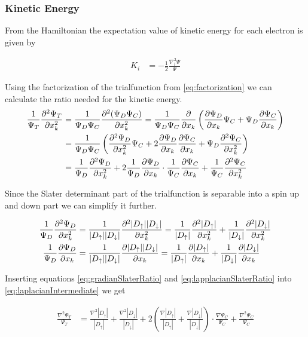 \documentclass[11pt]{article}
\begin{document}
		\subsubsection{Kinetic Energy}
			From the Hamiltonian the expectation value of kinetic energy for each electron is given by

			\begin{align}
				K_i &= - \frac{1}{2} \frac{\nabla^2_i \Psi}{\Psi}
			\end{align}

				Using the factorization of the trialfunction from \eqref{eq:factorization} we can calculate the ratio needed for the kinetic energy.
			\begin{align}
				\frac{1}{\Psi_T}\pdv[2]{\Psi_T}{x_k} &= \frac{1}{\Psi_D\Psi_C} \pdv[2]{(\Psi_D\Psi_C)}{x_k} = \frac{1}{\Psi_D\Psi_C} \pdv{}{x_k} \left( \pdv{\Psi_D}{x_k} \Psi_C +\Psi_D \pdv{\Psi_C}{x_k} \right)
				\\
				&= \frac{ 1 }{\Psi_D\Psi_C} \left( \pdv[2]{\Psi_D}{x_k} \Psi_C   + 2 \pdv{ \Psi_D }{x_k}\pdv{ \Psi_C }{x_k} + \Psi_D\pdv[2]{\Psi_C}{x_k} \right)
				\\
				&= \frac{1}{\Psi_D}\pdv[2]{\Psi_D}{x_k}  + 2 \frac{1}{\Psi_D} \pdv{ \Psi_D }{x_k} \cdot \frac{1}{\Psi_C}\pdv{ \Psi_C }{x_k} +  \frac{1}{\Psi_C}\pdv[2]{\Psi_C}{x_k} \label{eq:laplacianIntermediate}
			\end{align}

			Since the Slater determinant part of the trialfunction is separable into a spin up and down part we can simplify it further.

			\begin{align}
				\frac{1}{\Psi_D}\pdv[2]{\Psi_D}{x_k} &= \frac{1}{|D_\uparrow| |D_\downarrow|} \pdv[2]{ |D_\uparrow| |D_\downarrow| }{x_k}
				= \frac{1}{|D_\uparrow|} \pdv[2]{|D_\uparrow|}{x_k} + \frac{1}{|D_\downarrow|} \pdv[2]{|D_\downarrow|}{x_k} \label{eq:lapplacianSlaterRatio}
				\\
				\frac{1}{\Psi_D} \pdv{ \Psi_D }{x_k}  &=  \frac{1}{|D_\uparrow| |D_\downarrow|} \pdv{ |D_\uparrow| |D_\downarrow| }{x_k}
				= \frac{1}{|D_\uparrow|} \pdv{|D_\uparrow|}{x_k} + \frac{1}{|D_\downarrow|} \pdv{|D_\downarrow|}{x_k} \label{eq:gradianSlaterRatio}
			\end{align}

			Inserting equations \eqref{eq:gradianSlaterRatio} and \eqref{eq:lapplacianSlaterRatio} into \eqref{eq:laplacianIntermediate} we get

			\begin{align}
				\frac{\nabla^2 \Psi_T}{\Psi_T} &= \frac{\nabla^2 |D_\uparrow|}{|D_\uparrow|} + \frac{\nabla^2 |D_\downarrow|}{|D_\downarrow|} + 2 \left( \frac{\nabla |D_\uparrow|}{|D_\uparrow|} + \frac{\nabla |D_\downarrow|}{|D_\downarrow|} \right) \cdot \frac{\nabla\Psi_C}{\Psi_C} +  \frac{\nabla^2\Psi_C}{\Psi_C}
			\end{align}
\end{document}
